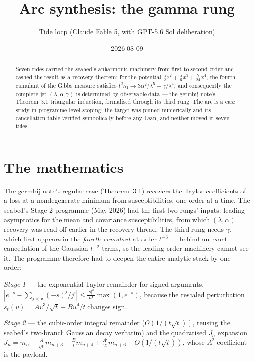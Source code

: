\documentclass[11pt]{article}
\title{Arc synthesis: the gamma rung}
\author{Tide loop (Claude Fable 5, with GPT-5.6 Sol deliberation)}
\date{2026-08-09}
\begin{document}
\maketitle

\begin{abstract}
\noindent
Seven tides carried the seabed's anharmonic machinery from first to
second order and cashed the result as a recovery theorem: for the
potential $\tfrac{\lambda}{2}x^2 + \tfrac{\alpha}{6}x^3 +
\tfrac{\gamma}{24}x^4$, the fourth cumulant of the Gibbs measure
satisfies $t^3\kappa_4 \to 3\alpha^2/\lambda^5 - \gamma/\lambda^4$, and
consequently the complete jet $(\lambda, \alpha, \gamma)$ is determined
by observable data --- the germbij note's Theorem~3.1 triangular
induction, formalised through its third rung. The arc is a case study
in programme-level scoping: the target was pinned numerically and its
cancellation table verified symbolically before any Lean, and neither
moved in seven tides.
\end{abstract}

\section{The mathematics}

The germbij note's regular case (Theorem~3.1) recovers the Taylor
coefficients of a loss at a nondegenerate minimum from susceptibilities,
one order at a time. The seabed's Stage-2 programme (May 2026) had the
first two rungs' inputs: leading asymptotics for the mean and
covariance susceptibilities, from which $(\lambda, \alpha)$ recovery was
read off earlier in the recovery thread. The third rung needs
$\gamma$, which first appears in the \emph{fourth cumulant} at order
$t^{-3}$ --- behind an exact cancellation of the Gaussian $t^{-2}$
terms, so the leading-order machinery cannot see it. The programme
therefore had to deepen the entire analytic stack by one order:

\emph{Stage 1} --- the exponential Taylor remainder for signed
arguments, $|e^{-s} - \sum_{j<n}(-s)^j/j!| \leq \tfrac{|s|^n}{n!}
\max(1, e^{-s})$, because the rescaled perturbation
$s_t(u) = Au^3/\sqrt t + Bu^4/t$ changes sign.

\emph{Stage 2} --- the cubic-order integral remainder
($O(1/(t\sqrt t))$, reusing the seabed's two-branch Gaussian decay
verbatim) and the quadratised $J_n$ expansion
$J_n = m_n - \tfrac{A}{\sqrt t}m_{n+3} - \tfrac{B}{t}m_{n+4} +
\tfrac{A^2}{2t}m_{n+6} + O(1/(t\sqrt t))$, whose $A^2$ coefficient is
the payload.
\end{document}
